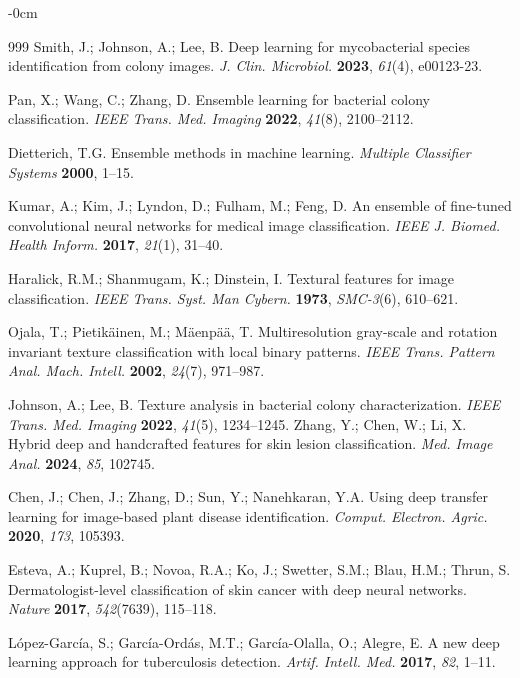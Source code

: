 \documentclass[journal,article,submit,pdftex,moreauthors]{Definitions/mdpi}
\begin{document}
\begin{adjustwidth}{-\extralength}{0cm}
\begin{thebibliography}{999}
Smith, J.; Johnson, A.; Lee, B. Deep learning for mycobacterial species identification from colony images. {\em J. Clin. Microbiol.} {\bf 2023}, {\em 61}(4), e00123-23.

Pan, X.; Wang, C.; Zhang, D. Ensemble learning for bacterial colony classification. {\em IEEE Trans. Med. Imaging} {\bf 2022}, {\em 41}(8), 2100–2112.

Dietterich, T.G. Ensemble methods in machine learning. {\em Multiple Classifier Systems} {\bf 2000}, 1–15.

Kumar, A.; Kim, J.; Lyndon, D.; Fulham, M.; Feng, D. An ensemble of fine-tuned convolutional neural networks for medical image classification. {\em IEEE J. Biomed. Health Inform.} {\bf 2017}, {\em 21}(1), 31–40.

Haralick, R.M.; Shanmugam, K.; Dinstein, I. Textural features for image classification. {\em IEEE Trans. Syst. Man Cybern.} {\bf 1973}, {\em SMC-3}(6), 610–621.

Ojala, T.; Pietikäinen, M.; Mäenpää, T. Multiresolution gray-scale and rotation invariant texture classification with local binary patterns. {\em IEEE Trans. Pattern Anal. Mach. Intell.} {\bf 2002}, {\em 24}(7), 971–987.

Johnson, A.; Lee, B. Texture analysis in bacterial colony characterization. {\em IEEE Trans. Med. Imaging} {\bf 2022}, {\em 41}(5), 1234–1245.
Zhang, Y.; Chen, W.; Li, X. Hybrid deep and handcrafted features for skin lesion classification. {\em Med. Image Anal.} {\bf 2024}, {\em 85}, 102745.

Chen, J.; Chen, J.; Zhang, D.; Sun, Y.; Nanehkaran, Y.A. Using deep transfer learning for image-based plant disease identification. {\em Comput. Electron. Agric.} {\bf 2020}, {\em 173}, 105393.

Esteva, A.; Kuprel, B.; Novoa, R.A.; Ko, J.; Swetter, S.M.; Blau, H.M.; Thrun, S. Dermatologist-level classification of skin cancer with deep neural networks. {\em Nature} {\bf 2017}, {\em 542}(7639), 115–118.

López-García, S.; García-Ordás, M.T.; García-Olalla, O.; Alegre, E. A new deep learning approach for tuberculosis detection. {\em Artif. Intell. Med.} {\bf 2017}, {\em 82}, 1–11.


\end{thebibliography}
\end{adjustwidth}
\end{document}
